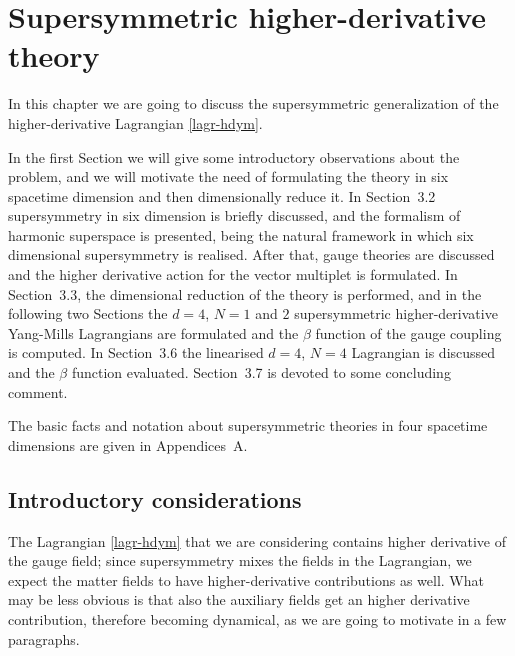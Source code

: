 

\chapter{Supersymmetric higher-derivative theory }

\pagestyle{fancy}
	\fancyhead{} %
	\fancyhead[LE]{\scshape \leftmark}
	\fancyhead[RO]{\scshape \rightmark}
	\fancyfoot[CE,CO]{\thepage}
	\fancyfoot[LO,RO]{ }
	\fancyfoot[LE,RE]{ }
	\renewcommand{\headrulewidth}{0.4pt}
	\renewcommand{\footrulewidth}{0.4pt}

In this chapter we are going to discuss the supersymmetric generalization of the higher-derivative \ym{} Lagrangian \eqref{lagr-hdym}. 

In the first Section we will give some introductory observations about the problem, and we will motivate the need of formulating the theory in six spacetime dimension and then dimensionally reduce it. In Section~3.2 supersymmetry in six dimension is briefly discussed, and the formalism of harmonic superspace is presented, being the natural framework in which six dimensional supersymmetry is realised. After that, gauge theories are discussed and the higher derivative action for the vector multiplet is formulated.
In Section~3.3, the dimensional reduction of the theory is performed, and in the following two Sections the $d=4$, $N=1$ and $2$ supersymmetric higher-derivative Yang-Mills Lagrangians are formulated and the $\beta$ function of the gauge coupling is computed. In Section~3.6 the linearised $d=4$, $N=4$ Lagrangian is discussed and the $\beta$ function evaluated. Section~3.7 is devoted to some concluding comment.

The basic facts and notation about supersymmetric theories in four spacetime dimensions are given in Appendices~A.




\section{Introductory considerations}

The Lagrangian \eqref{lagr-hdym} that we are considering contains higher derivative of the gauge field; since supersymmetry mixes the fields in the Lagrangian, we expect the matter fields to have higher-derivative contributions as well.
What may be less obvious is that also the auxiliary fields get an higher derivative contribution, therefore becoming dynamical, as we are going to motivate in a few paragraphs.



